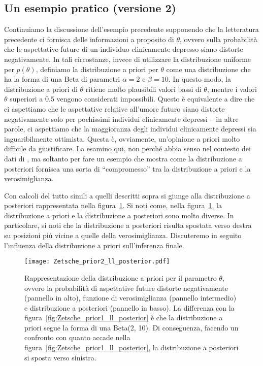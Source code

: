 \subsection{Un esempio pratico (versione 2)}

Continuiamo la discussione dell'esempio precedente supponendo che la letteratura precedente ci fornisca delle informazioni a proposito di $\theta$, ovvero sulla probabilità che le aspettative future di un individuo clinicamente depresso siano distorte negativamente.
In tali circostanze, invece di utilizzare la distribuzione uniforme per $p(\theta)$,
definiamo la distribuzione a priori per $\theta$ come una distribuzione che ha la forma di una Beta di parametri $\alpha = 2$ e $\beta = 10$. 
In questo modo, la distribuzione a priori di $\theta$ ritiene molto plausibili valori bassi di $\theta$, mentre i valori $\theta$ superiori a 0.5 vengono considerati impossibili. 
Questo è equivalente a dire che ci aspettiamo che le aspettative relative all'umore futuro siano distorte negativamente solo per pochissimi individui clinicamente depressi -- in altre parole, ci aspettiamo che la maggioranza degli individui clinicamente depressi sia inguaribilmente ottimista.  
Questa è, ovviamente, un'opinione a priori molto difficile da giustificare. 
La esamino qui, non perché abbia senso nel contesto dei dati di \citet{zetsche_future_2019}, ma soltanto per fare un esempio che mostra come la distribuzione a posteriori fornisca una sorta di \enquote{compromesso} tra la distribuzione a priori e la verosimiglianza. 

Con calcoli del tutto simili a quelli descritti sopra si giunge alla distribuzione a posteriori rappresentata nella figura~\ref{fig:Zetsche_2_posterior}. 
Si noti come, nella figura~\ref{fig:Zetsche_2_posterior}, la distribuzione a priori e la distribuzione a posteriori sono molto diverse.
In particolare, si noti che la distribuzione a posteriori risulta spostata verso destra su posizioni più vicine a quelle della verosimiglianza.
Discuteremo in seguito l'influenza della distribuzione a priori sull'inferenza finale.

\begin{figure}
 \label{fig:Zetsche_2_posterior}
 \centering
 \texttt{[image: Zetsche\_prior2\_ll\_posterior.pdf]}
 \caption{Rappresentazione della distribuzione a priori per il parametro $\theta$, ovvero la probabilità di aspettative future distorte negativamente \citep{zetsche_future_2019} (pannello in alto), funzione di verosimiglianza (pannello intermedio) e distribuzione a posteriori (pannello in basso). La differenza con la figura~\ref{fig:Zetsche_prior1_ll_posterior} è che la distribuzione a priori segue la forma di una Beta(2, 10). 
Di conseguenza, facendo un confronto con quanto accade nella figura~\ref{fig:Zetsche_prior1_ll_posterior}, la distribuzione a posteriori si sposta verso sinistra.}
\end{figure}

